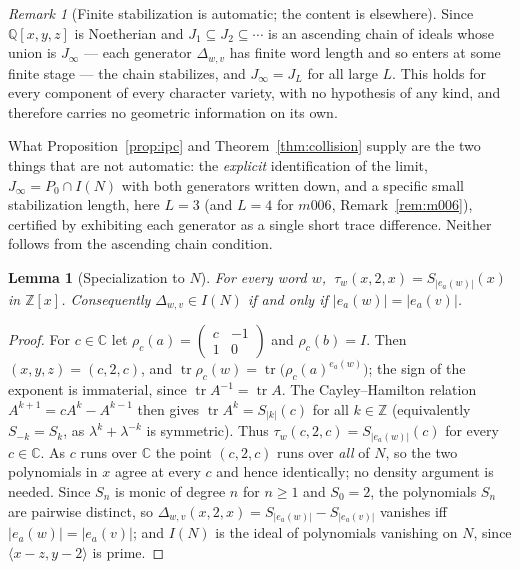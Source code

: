 \documentclass[11pt,a4paper]{article}
\newtheorem{lemma}[theorem]{Lemma}
\theoremstyle{definition}
\theoremstyle{remark}
\newtheorem{remark}[theorem]{Remark}
\newcommand{\tr}{\operatorname{tr}}
\newcommand{\Q}{\mathbb{Q}}
\newcommand{\Z}{\mathbb{Z}}
\begin{document}
\begin{remark}[Finite stabilization is automatic; the content is elsewhere]
\label{rem:noeth}
Since $\Q[x,y,z]$ is Noetherian and
$J_1\subseteq J_2\subseteq\cdots$ is an ascending chain of ideals whose
union is $J_\infty$ --- each generator $\Delta_{w,v}$ has finite word
length and so enters at some finite stage --- the chain stabilizes, and
$J_\infty=J_L$ for all large $L$. This holds for every component of
every character variety, with no hypothesis of any kind, and therefore
carries no geometric information on its own.

What Proposition~\ref{prop:ipc} and Theorem~\ref{thm:collision} supply
are the two things that are not automatic: the \emph{explicit}
identification of the limit, $J_\infty=P_0\cap I(N)$ with both
generators written down, and a specific small stabilization length,
here $L=3$ (and $L=4$ for $m006$, Remark~\ref{rem:m006}), certified by
exhibiting each generator as a single short trace difference. Neither
follows from the ascending chain condition.
\end{remark}

\begin{lemma}[Specialization to $N$]
\label{lem:nexp}
For every word $w$, $\ \tau_w(x,2,x)=S_{|e_a(w)|}(x)$ in $\Z[x]$.
Consequently $\Delta_{w,v}\in I(N)$ if and only if $|e_a(w)|=|e_a(v)|$.
\end{lemma}

\begin{proof}
For $c\in\mathbb{C}$ let $\rho_c(a)=\begin{pmatrix}c&-1\\1&0\end{pmatrix}$
and $\rho_c(b)=I$. Then $(x,y,z)=(c,2,c)$, and
$\tr\rho_c(w)=\tr\bigl(\rho_c(a)^{e_a(w)}\bigr)$; the sign of the exponent
is immaterial, since $\tr A^{-1}=\tr A$. The Cayley--Hamilton relation
$A^{k+1}=cA^k-A^{k-1}$ then gives $\tr A^k=S_{|k|}(c)$ for all
$k\in\Z$ (equivalently $S_{-k}=S_k$, as $\lambda^k+\lambda^{-k}$ is
symmetric). Thus $\tau_w(c,2,c)=S_{|e_a(w)|}(c)$ for every
$c\in\mathbb{C}$. As $c$ runs over $\mathbb{C}$ the point $(c,2,c)$ runs
over \emph{all} of $N$, so the two polynomials in $x$
agree at every $c$ and hence identically; no density argument is needed.
Since $S_n$ is monic of degree $n$ for
$n\ge1$ and $S_0=2$, the polynomials $S_n$ are pairwise distinct, so
$\Delta_{w,v}(x,2,x)=S_{|e_a(w)|}-S_{|e_a(v)|}$ vanishes iff
$|e_a(w)|=|e_a(v)|$; and $I(N)$ is the ideal of polynomials vanishing on
$N$, since $\langle x-z,y-2\rangle$ is prime.
\end{proof}
\end{document}
